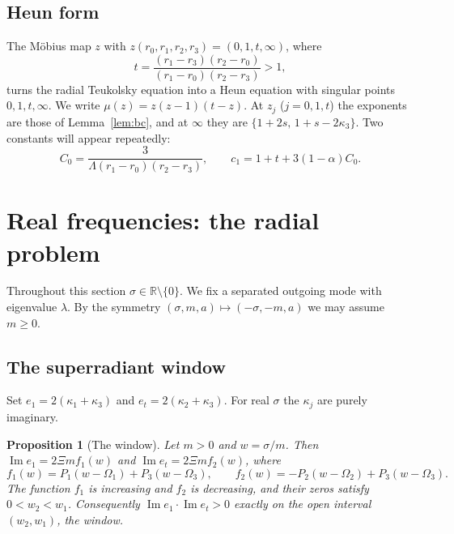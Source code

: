\documentclass[11pt]{amsart}
\newtheorem{proposition}[theorem]{Proposition}
\theoremstyle{definition}
\theoremstyle{remark}
\numberwithin{equation}{section}
\newcommand{\R}{\mathbb{R}}
\renewcommand{\Im}{\operatorname{Im}}
\begin{document}
\subsection{Heun form}
The M\"obius map $z$ with $z(r_0,r_1,r_2,r_3)=(0,1,t,\infty)$, where
\[
t=\frac{(r_1-r_3)(r_2-r_0)}{(r_1-r_0)(r_2-r_3)}>1,
\]
turns the radial Teukolsky equation into a Heun equation with singular points $0,1,t,\infty$. We write
$\mu(z)=z(z-1)(t-z)$. At $z_j$ ($j=0,1,t$) the exponents are those of Lemma~\ref{lem:bc}, and at $\infty$ they are
$\{1+2s,\,1+s-2\kappa_3\}$. Two constants will appear repeatedly:
\begin{equation}\label{eq:C0}
C_0=\frac{3}{\Lambda(r_1-r_0)(r_2-r_3)},\qquad c_1=1+t+3(1-\alpha)C_0.
\end{equation}

\section{Real frequencies: the radial problem}\label{sec:radial}

Throughout this section $\sigma\in\R\setminus\{0\}$. We fix a separated outgoing mode with eigenvalue $\lambda$. By
the symmetry $(\sigma,m,a)\mapsto(-\sigma,-m,a)$ we may assume $m\ge0$.

\subsection{The superradiant window}
Set $e_1=2(\kappa_1+\kappa_3)$ and $e_t=2(\kappa_2+\kappa_3)$. For real $\sigma$ the $\kappa_j$ are purely imaginary.

\begin{proposition}[The window]\label{prop:window}
Let $m>0$ and $w=\sigma/m$. Then $\Im e_1=2\Xi mf_1(w)$ and $\Im e_t=2\Xi mf_2(w)$, where
\[
f_1(w)=P_1(w-\Omega_1)+P_3(w-\Omega_3),\qquad f_2(w)=-P_2(w-\Omega_2)+P_3(w-\Omega_3).
\]
The function $f_1$ is increasing and $f_2$ is decreasing, and their zeros satisfy $0<w_2<w_1$. Consequently
$\Im e_1\cdot\Im e_t>0$ exactly on the open interval $(w_2,w_1)$, the \emph{window}.
\end{proposition}
\end{document}
